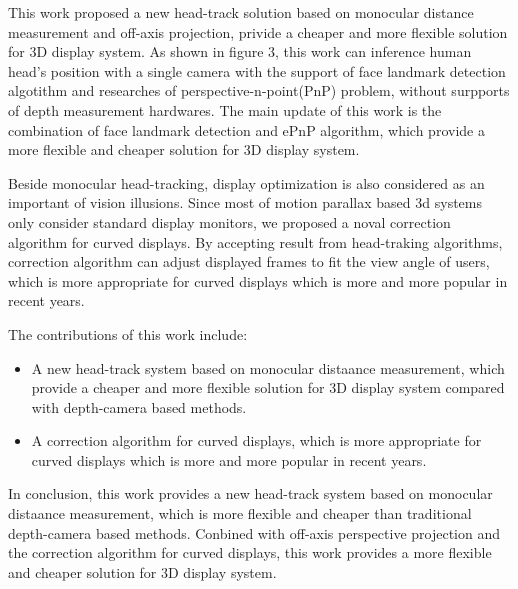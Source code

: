 This work proposed a new head-track solution based on monocular distance measurement and off-axis projection, privide a cheaper and more flexible solution for 3D display system. As shown in figure 3, this work can inference human head's position with a single camera with the support of face landmark detection algotithm and researches of perspective-n-point(PnP) problem, without surpports of depth measurement hardwares. The main update of this work is the combination of face landmark detection and ePnP algorithm\cite{EPnP_2009}, which provide a more flexible and cheaper solution for 3D display system. 


Beside monocular head-tracking, display optimization is also considered as an important of vision illusions. Since most of motion parallax based 3d systems only consider standard display monitors, we proposed a noval correction algorithm for curved displays. By accepting result from head-traking algorithms, correction algorithm can adjust displayed frames to fit the view angle of users, which is more appropriate for curved displays which is more and more popular in recent years.

The contributions of this work include:

\begin{itemize}
    \item A new head-track system based on monocular distaance measurement, which provide a cheaper and more flexible solution for 3D display system compared with depth-camera based methods.
    \item A correction algorithm for curved displays, which is more appropriate for curved displays which is more and more popular in recent years.
\end{itemize}

In conclusion, this work provides a new head-track system based on monocular distaance measurement, which is more flexible and cheaper than traditional depth-camera based methods. Conbined with off-axis perspective projection and the correction algorithm for curved displays, this work provides a more flexible and cheaper solution for 3D display system.


\clearpage
